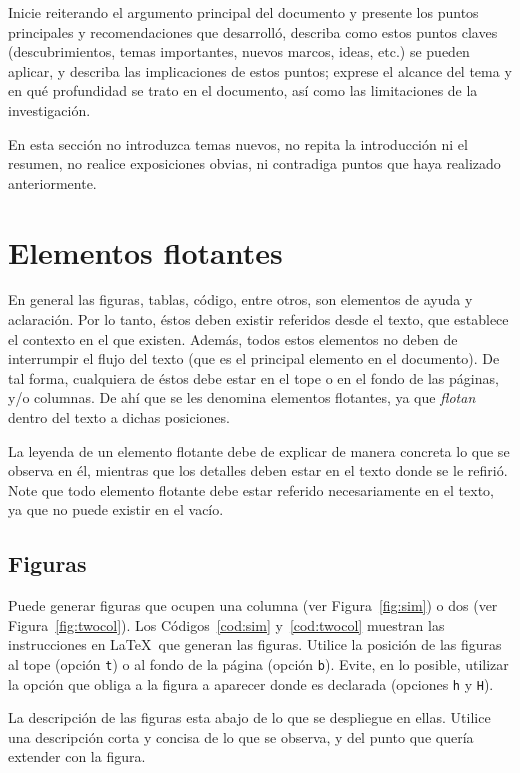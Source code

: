 \documentclass[twocolumn,11pts]{IEEEtran}
\begin{document}
Inicie reiterando el argumento principal del documento y presente los puntos principales y recomendaciones que desarrolló, describa como estos puntos claves (descubrimientos, temas importantes, nuevos marcos, ideas, etc.) se pueden aplicar, y describa las implicaciones de estos puntos; exprese el alcance del tema y en qué profundidad se trato en el documento, así como las limitaciones de la investigación. 

En esta sección no introduzca temas nuevos, no repita la introducción ni el resumen, no realice exposiciones obvias, ni contradiga puntos que haya realizado anteriormente.

\section{Elementos flotantes}

En general las figuras, tablas, código, entre otros, son elementos de ayuda y aclaración. Por lo tanto, éstos deben existir referidos desde el texto, que establece el contexto en el que existen. Además, todos estos elementos no deben de interrumpir el flujo del texto (que es el principal elemento en el documento). De tal forma, cualquiera de éstos debe estar en el tope o en el fondo de las páginas, y/o columnas. De ahí que se les denomina elementos flotantes, ya que \emph{flotan} dentro del texto a dichas posiciones. 

La leyenda de un elemento flotante debe de explicar de manera concreta lo que se observa en él, mientras que los detalles deben estar en el texto donde se le refirió. Note que todo elemento flotante debe estar referido necesariamente en el texto, ya que no puede existir en el vacío.


\subsection{Figuras}
\label{sec:figuras}

Puede generar figuras que ocupen una columna (ver Figura~\ref{fig:sim}) o dos (ver Figura~\ref{fig:twocol}). Los Códigos~\ref{cod:sim} y~\ref{cod:twocol} muestran las instrucciones en \LaTeX\ que generan las figuras. Utilice la posición de las figuras al tope (opción \texttt{t}) o al fondo de la página (opción \texttt{b}). Evite, en lo posible, utilizar la opción que obliga a la figura a aparecer donde es declarada (opciones \texttt{h} y \texttt{H}).

La descripción de las figuras esta abajo de lo que se despliegue en ellas. Utilice una descripción corta y concisa de lo que se observa, y del punto que quería extender con la figura.
\end{document}
